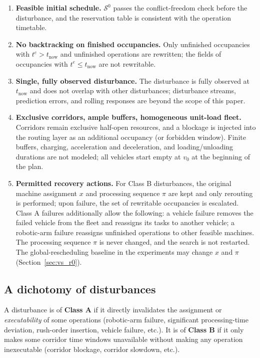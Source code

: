 \begin{enumerate}[label=\textbf{A\arabic*.},leftmargin=*,topsep=2pt,itemsep=2pt]
\item \textbf{Feasible initial schedule.} \(\mathcal{S}^0\) passes the conflict-freedom check before the disturbance, and the reservation table is consistent with the operation timetable.
\item \textbf{No backtracking on finished occupancies.} Only unfinished occupancies with \(t^e>t_{\mathrm{now}}\)
and unfinished operations are rewritten; the fields of occupancies with \(t^e\le t_{\mathrm{now}}\) are not rewritable.
\item \textbf{Single, fully observed disturbance.} The disturbance is fully observed at \(t_{\mathrm{now}}\) and does not overlap with other disturbances;
disturbance streams, prediction errors, and rolling responses are beyond the scope of this paper.
\item \textbf{Exclusive corridors, ample buffers, homogeneous unit-load fleet.} Corridors remain exclusive half-open resources, and a blockage is injected into the routing layer as an additional occupancy
(or forbidden window). Finite buffers, charging, acceleration and deceleration, and loading/unloading durations are not modeled;
all vehicles start empty at \(v_0\) at the beginning of the plan.
\item \textbf{Permitted recovery actions.} For Class B disturbances, the original machine assignment \(x\) and processing sequence \(\pi\) are kept and only rerouting is performed;
upon failure, the set of rewritable occupancies is escalated. Class A failures additionally allow the following: a vehicle failure removes the failed vehicle from the fleet and reassigns its tasks to another vehicle;
a robotic-arm failure reassigns unfinished operations to other feasible machines. The processing sequence \(\pi\) is never changed, and the search is not restarted.
The global-rescheduling baseline in the experiments may change \(x\) and \(\pi\) (Section~\ref{sec:vs_r0}).
\end{enumerate}

\subsection{A dichotomy of disturbances}
\label{sec:disturbance_classes}

\begin{definition}
\label{def:ab}
A disturbance is of \textbf{Class A} if it directly invalidates the assignment or \emph{executability} of some operations (robotic-arm failure, significant processing-time deviation, rush-order insertion,
vehicle failure, etc.). It is of \textbf{Class B} if it only makes some corridor time windows unavailable without making any operation
inexecutable (corridor blockage, corridor slowdown, etc.).
\end{definition}

